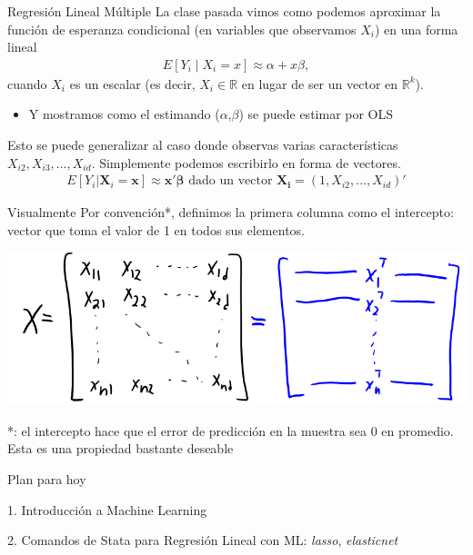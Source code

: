 \documentclass[11pt,handout,aspectratio=169]{beamer}
\begin{document}
\begin{frame}{Regresión Lineal Múltiple}
La clase pasada vimos como podemos aproximar la función de esperanza condicional (en variables que observamos $X_i$) en una forma lineal 
\begin{align*}
E[Y_i \mid X_i =x ] \approx \alpha + x \beta ,
\end{align*}
cuando $X_i$ es un escalar (es decir, $X_i\in \mathbb{R}$ en lugar de ser un vector en $\mathbb{R}^k$).
			\begin{itemize}
					\item 
					Y mostramos como el estimando ($\alpha$,$\beta$) se puede estimar por OLS
				\end{itemize}

\vspace{.5cm}
Esto se puede generalizar al caso donde observas varias características $X_{i2}, X_{i3}, \dots, X_{id}$. Simplemente podemos escribirlo en forma de vectores. 
\begin{align*}
E[Y_i| \mathbf{X}_i =\mathbf{x} ] \approx \mathbf{x}' \bm{\beta} \text{ dado un vector } \mathbf{X_i} = (1,X_{i2},...,X_{id})'
\end{align*}

\end{frame}

\begin{frame}{Visualmente}
Por convención*, definimos la primera columna como el intercepto: vector que toma el valor de 1 en todos sus elementos.
\begin{center}
\includegraphics[scale=0.5]{xmat.png}
\end{center}

\vspace{0.8cm}
*: el intercepto hace que el error de predicción en la muestra sea 0 en promedio. Esta es una propiedad bastante deseable
\end{frame}

	
	\begin{frame}{Plan para hoy}

	1. Introducción a Machine Learning
	\vspace{0.8cm}
	
	2. Comandos de Stata para Regresión Lineal con ML: \textit{lasso}, \textit{elasticnet}
	
	\end{frame}
	
\end{document}
